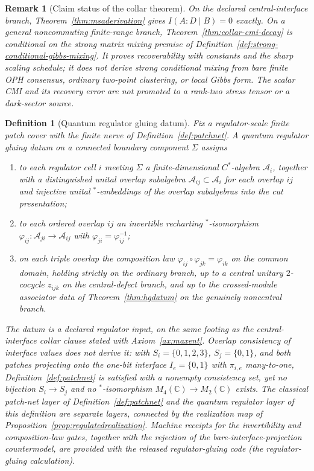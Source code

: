 \documentclass[11pt]{article}
\newtheorem{definition}[theorem]{Definition}
\newtheorem{remark}[theorem]{Remark}
\begin{document}
\begin{remark}[Claim status of the collar theorem]\label{rem:collar-cmi-claim-status}
On the declared central-interface branch, Theorem~\ref{thm:msaderivation} gives
\(I(A:D\mid B)=0\) exactly. On a general noncommuting finite-range branch,
Theorem~\ref{thm:collar-cmi-decay} is conditional on the strong matrix mixing premise of
Definition~\ref{def:strong-conditional-gibbs-mixing}. It proves recoverability with constants and
the sharp scaling schedule; it does not derive strong conditional mixing from bare finite OPH
consensus, ordinary two-point clustering, or local Gibbs form. The scalar CMI and its recovery
error are not promoted to a rank-two stress tensor or a dark-sector source.
\end{remark}

\begin{definition}[Quantum regulator gluing datum]\label{def:qregdatum}
Fix a regulator-scale finite patch cover with the finite nerve of Definition~\ref{def:patchnet}. A \emph{quantum regulator gluing datum} on a connected boundary component \(\Sigma\) assigns
\begin{enumerate}[leftmargin=2em]
\item to each regulator cell \(i\) meeting \(\Sigma\) a finite-dimensional \(C^*\)-algebra \(\mathcal A_i\), together with a distinguished unital overlap subalgebra \(\mathcal A_{ij}\subset\mathcal A_i\) for each overlap \(ij\) and injective unital \(^*\)-embeddings of the overlap subalgebras into the cut presentation;
\item to each ordered overlap \(ij\) an invertible recharting \(^*\)-isomorphism
\(\varphi_{ij}:\mathcal A_{ji}\to\mathcal A_{ij}\) with \(\varphi_{ji}=\varphi_{ij}^{-1}\);
\item on each triple overlap the composition law \(\varphi_{ij}\circ\varphi_{jk}=\varphi_{ik}\) on the common domain, holding strictly on the ordinary branch, up to a central unitary \(2\)-cocycle \(z_{ijk}\) on the central-defect branch, and up to the crossed-module associator data of Theorem~\ref{thm:hgdatum} on the genuinely noncentral branch.
\end{enumerate}
The datum is a declared regulator input, on the same footing as the central-interface collar clause stated with Axiom~\ref{ax:maxent}. Overlap consistency of interface values does not derive it: with \(S_i=\{0,1,2,3\}\), \(S_j=\{0,1\}\), and both patches projecting onto the one-bit interface \(I_e=\{0,1\}\) with \(\pi_{i,e}\) many-to-one, Definition~\ref{def:patchnet} is satisfied with a nonempty consistency set, yet no bijection \(S_i\to S_j\) and no \(^*\)-isomorphism \(M_4(\mathbb C)\to M_2(\mathbb C)\) exists. The classical patch-net layer of Definition~\ref{def:patchnet} and the quantum regulator layer of this definition are separate layers, connected by the realization map of Proposition~\ref{prop:regulatedrealization}. Machine receipts for the invertibility and composition-law gates, together with the rejection of the bare-interface-projection countermodel, are provided with the released regulator-gluing code (the regulator-gluing calculation).
\end{definition}
\end{document}
